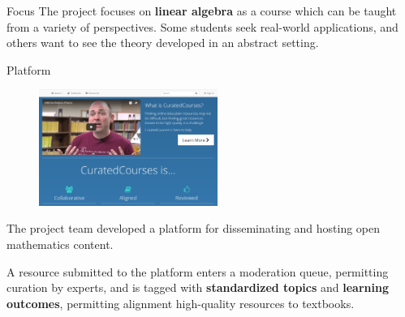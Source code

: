\begin{sectionblock}{Focus}
  The project focuses on \textbf{linear algebra} as a course which can
  be taught from a variety of perspectives.  Some students seek
  real-world applications, and others want to see the theory developed
  in an abstract setting.

\end{sectionblock}

\begin{sectionblock}{Platform}

  \begin{figure}
    \includegraphics[width=0.52\textwidth]{landing-page.png}
  \end{figure}

  The project team developed a platform for disseminating and hosting 
  open mathematics content.

  \vspace{1ex}A resource submitted to the platform enters a moderation queue,
  permitting curation by experts, and is tagged with
  \textbf{standardized topics} and \textbf{learning outcomes},
  permitting alignment high-quality resources to textbooks.
\end{sectionblock}